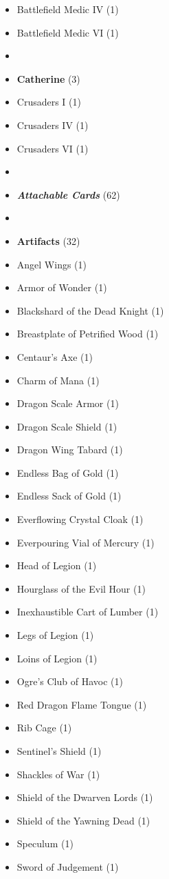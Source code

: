 \begin{multicols*}{3}
\begin{itemize}[leftmargin=0pt, label={}, noitemsep]
  \item Battlefield Medic IV (1)
  \item Battlefield Medic VI (1)
  \item
  \item \textbf{Catherine} (3)
  \item Crusaders I (1)
  \item Crusaders IV (1)
  \item Crusaders VI (1)
  \item
  \item \textbf{\emph{Attachable Cards}} (62)
  \item
  \item \textbf{Artifacts} (32)
  \item Angel Wings (1)
  \item Armor of Wonder (1)
  \item Blackshard of the Dead Knight (1)
  \item Breastplate of Petrified Wood (1)
  \item Centaur's Axe (1)
  \item Charm of Mana (1)
  \item Dragon Scale Armor (1)
  \item Dragon Scale Shield (1)
  \item Dragon Wing Tabard (1)
  \item Endless Bag of Gold (1)
  \item Endless Sack of Gold (1)
  \item Everflowing Crystal Cloak (1)
  \item Everpouring Vial of Mercury (1)
  \item Head of Legion (1)
  \item Hourglass of the Evil Hour (1)
  \item Inexhaustible Cart of Lumber (1)
  \item Legs of Legion (1)
  \item Loins of Legion (1)
  \item Ogre's Club of Havoc (1)
  \item Red Dragon Flame Tongue (1)
  \item Rib Cage (1)
  \item Sentinel's Shield (1)
  \item Shackles of War (1)
  \item Shield of the Dwarven Lords (1)
  \item Shield of the Yawning Dead (1)
  \item Speculum (1)
  \item Sword of Judgement (1)

\end{itemize}
\end{multicols*}
